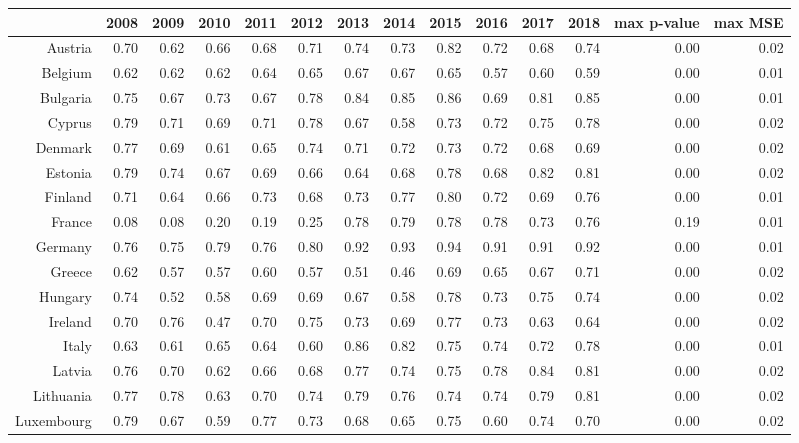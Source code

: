 \documentclass[a4paper,twoside,10pt]{article}
\begin{document}
	
	\begin{table}[H]
		\centering
		\tabcolsep=0.11cm
		\begin{tabular}{rrrrrrrrrrrrrr}
			\hline
			& 2008 & 2009 & 2010 & 2011 & 2012 & 2013 & 2014 & 2015 & 2016 & 2017 & 2018 & max p-value & max MSE \\ 
			\hline
			Austria & 0.70 & 0.62 & 0.66 & 0.68 & 0.71 & 0.74 & 0.73 & 0.82 & 0.72 & 0.68 & 0.74 & 0.00 & 0.02 \\ 
			Belgium & 0.62 & 0.62 & 0.62 & 0.64 & 0.65 & 0.67 & 0.67 & 0.65 & 0.57 & 0.60 & 0.59 & 0.00 & 0.01 \\
			Bulgaria & 0.75 & 0.67 & 0.73 & 0.67 & 0.78 & 0.84 & 0.85 & 0.86 & 0.69 & 0.81 & 0.85 & 0.00 & 0.01 \\
			Cyprus & 0.79 & 0.71 & 0.69 & 0.71 & 0.78 & 0.67 & 0.58 & 0.73 & 0.72 & 0.75 & 0.78 & 0.00 & 0.02 \\ 
			Denmark & 0.77 & 0.69 & 0.61 & 0.65 & 0.74 & 0.71 & 0.72 & 0.73 & 0.72 & 0.68 & 0.69 & 0.00 & 0.02 \\
			Estonia & 0.79 & 0.74 & 0.67 & 0.69 & 0.66 & 0.64 & 0.68 & 0.78 & 0.68 & 0.82 & 0.81 & 0.00 & 0.02 \\ 
			Finland & 0.71 & 0.64 & 0.66 & 0.73 & 0.68 & 0.73 & 0.77 & 0.80 & 0.72 & 0.69 & 0.76 & 0.00 & 0.01 \\
			\rowcolor{lightgray} France & 0.08 & 0.08 & 0.20 & 0.19 & 0.25 & 0.78 & 0.79 & 0.78 & 0.78 & 0.73 & 0.76 & 0.19 & 0.01 \\
			Germany & 0.76 & 0.75 & 0.79 & 0.76 & 0.80 & 0.92 & 0.93 & 0.94 & 0.91 & 0.91 & 0.92 & 0.00 & 0.01 \\
			Greece & 0.62 & 0.57 & 0.57 & 0.60 & 0.57 & 0.51 & 0.46 & 0.69 & 0.65 & 0.67 & 0.71 & 0.00 & 0.02 \\ 
			Hungary & 0.74 & 0.52 & 0.58 & 0.69 & 0.69 & 0.67 & 0.58 & 0.78 & 0.73 & 0.75 & 0.74 & 0.00 & 0.02 \\
			Ireland & 0.70 & 0.76 & 0.47 & 0.70 & 0.75 & 0.73 & 0.69 & 0.77 & 0.73 & 0.63 & 0.64 & 0.00 & 0.02 \\
			Italy & 0.63 & 0.61 & 0.65 & 0.64 & 0.60 & 0.86 & 0.82 & 0.75 & 0.74 & 0.72 & 0.78 & 0.00 & 0.01 \\ 
			Latvia & 0.76 & 0.70 & 0.62 & 0.66 & 0.68 & 0.77 & 0.74 & 0.75 & 0.78 & 0.84 & 0.81 & 0.00 & 0.02 \\
			Lithuania & 0.77 & 0.78 & 0.63 & 0.70 & 0.74 & 0.79 & 0.76 & 0.74 & 0.74 & 0.79 & 0.81 & 0.00 & 0.02 \\
			Luxembourg & 0.79 & 0.67 & 0.59 & 0.77 & 0.73 & 0.68 & 0.65 & 0.75 & 0.60 & 0.74 & 0.70 & 0.00 & 0.02 \\ 

\end{tabular}
\end{table}
\end{document}

